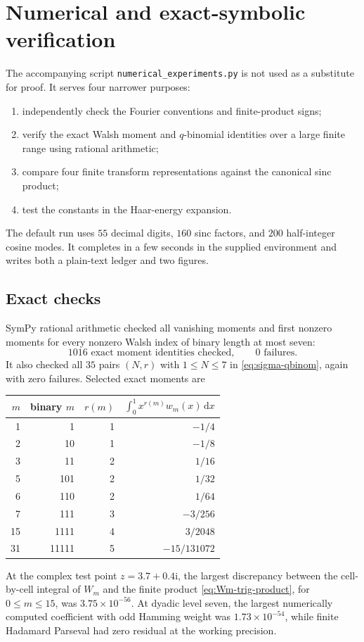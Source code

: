 \documentclass[11pt,oneside]{article}
\theoremstyle{definition}
\theoremstyle{remark}
\newcommand{\ii}{\mathrm i}
\newcommand{\dd}{\,\mathrm d}
\begin{document}
\section{Numerical and exact-symbolic verification}
\label{sec:numerics}

The accompanying script \texttt{numerical\_experiments.py} is not used as a
substitute for proof.  It serves four narrower purposes:
\begin{enumerate}
\item independently check the Fourier conventions and finite-product signs;
\item verify the exact Walsh moment and $q$-binomial identities over a large
      finite range using rational arithmetic;
\item compare four finite transform representations against the canonical sinc
      product;
\item test the constants in the Haar-energy expansion.
\end{enumerate}
The default run uses $55$ decimal digits, $160$ sinc factors, and $200$
half-integer cosine modes.  It completes in a few seconds in the supplied
environment and writes both a plain-text ledger and two figures.

\subsection{Exact checks}

SymPy rational arithmetic checked all vanishing moments and first nonzero
moments for every nonzero Walsh index of binary length at most seven:
\begin{equation}\label{eq:numerical-Walsh-count}
 1016\text{ exact moment identities checked},\qquad0\text{ failures}.
\end{equation}
It also checked all $35$ pairs $(N,r)$ with $1\le N\le7$ in
\eqref{eq:sigma-qbinom}, again with zero failures.  Selected exact moments are
\begin{center}
\begin{tabular}{@{}rrrr@{}}
\toprule
$m$ & binary $m$ & $r(m)$ & $\int_0^1x^{r(m)}w_m(x)\dd x$\\
\midrule
1  & 1     & 1 & $-1/4$\\
2  & 10    & 1 & $-1/8$\\
3  & 11    & 2 & $1/16$\\
5  & 101   & 2 & $1/32$\\
6  & 110   & 2 & $1/64$\\
7  & 111   & 3 & $-3/256$\\
15 & 1111  & 4 & $3/2048$\\
31 & 11111 & 5 & $-15/131072$\\
\bottomrule
\end{tabular}
\end{center}
At the complex test point $z=3.7+0.4\ii$, the largest discrepancy between the
cell-by-cell integral of $W_m$ and the finite product
\eqref{eq:Wm-trig-product}, for $0\le m\le15$, was
$3.75\times10^{-56}$.  At dyadic level seven, the largest numerically computed
coefficient with odd Hamming weight was $1.73\times10^{-54}$, while finite
Hadamard Parseval had zero residual at the working precision.
\end{document}

